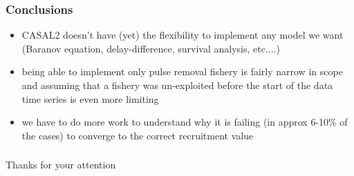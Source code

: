 \documentclass{beamer}
\begin{document}
\begin{frame}
\frametitle{Conclusions}

\begin{itemize}
\item CASAL2 doesn't have (yet) the flexibility to implement any model we want (Baranov equation, delay-difference, survival analysis, etc....)
\item being able to implement only pulse removal fishery is fairly narrow in scope and assuming that a fishery was un-exploited before the start of the data time series is even more limiting
\item we have to do more work to understand why it is failing (in approx 6-10\% of the cases) to converge to the correct recruitment value
\end{itemize}

\end{frame}

\begin{frame}
\frametitle{}

Thanks for your attention

\end{frame}





\end{document}
